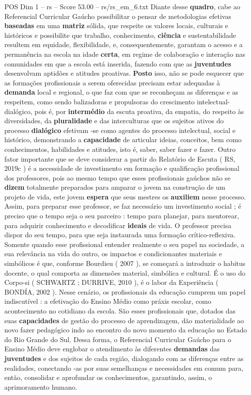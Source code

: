 \begin{textsample}{POS Dim 1 – rs – Score 53.00 – rs/rs\_em\_6.txt}
Diante desse \textbf{quadro}, cabe ao Referencial Curricular Gaúcho possibilitar o pensar de metodologias efetivas \textbf{baseadas} em uma \textbf{matriz} sólida, que respeite os valores locais, culturais e históricos e possibilite que trabalho, conhecimento, \textbf{ciência} e sustentabilidade resultem em equidade, flexibilidade, e, consequentemente, garantam o acesso e a permanência na escola na idade \textbf{certa}, em regime de colaboração e interação nas comunidades em que a escola está inserida, fazendo com que as \textbf{juventudes} desenvolvam aptidões e atitudes proativas. \textbf{Posto} isso, não se pode esquecer que as formações profissionais a serem oferecidas precisam estar adequadas à \textbf{demanda} local e regional, o que faz com que se reconheçam as diferenças e as respeitem, como sendo balizadoras e propulsoras do crescimento intelectual-dialógico, pois é, por \textbf{intermédio} da escuta proativa, da empatia, do respeito às diversidades, da \textbf{pluralidade} e das interculturas que os sujeitos ativos do processo \textbf{dialógico} efetivam -se como agentes do processo intelectual, social e histórico, demonstrando a \textbf{capacidade} de articular ideias, conceitos, bem como conhecimentos, habilidades e atitudes, isto é, saber, saber fazer e fazer.
Outro fator importante que se deve considerar a partir do Relatório de Escuta ( RS, 2019c ) é a necessidade de investimento em formação e qualificação profissional dos professores, pois ao mesmo tempo que esses profissionais gaúchos não se \textbf{dizem} totalmente preparados para amparar o jovem na construção de um projeto de vida, este jovem \textbf{espera} que seus mestres os \textbf{auxiliem} nesse processo.
Assim, para preparar esse professor, se faz necessário um investimento social ; é preciso que o tempo seja o seu parceiro : tempo para planejar, para mentorear, para adquirir conhecimento e decodificar \textbf{ideais} de vida.
O professor precisa dispor do seu tempo, para que seja instaurada uma formação crítico-reflexiva.
Somente quando esse profissional entender realmente o seu papel na sociedade, a sua relevância na vida do outro, os impactos e condicionantes materiais e simbólicos é que, conforme Bourdieu ( 2007 ), se começará a introduzir o habitus docente, o qual comporta as dimensões material, simbólica e cultural.
É o uso do Corpo-si ( SCHWARTZ ; DURRIVE, 2010 ), é o labor da Experiência ( BONDÍA, 2002 ).
Nesse cenário, os profissionais da educação cumprem um papel indiscutível : a efetivação do Ensino Médio como práxis escolar, como acontecimento no cotidiano da escola.
São esses profissionais que, dotados das suas \textbf{capacidades} de gestão do processo de aprendizagem, dão materialidade ao novo fazer pedagógico indo ao encontro do novo momento da educação no Estado do Rio Grande do Sul.
Dessa forma, o Referencial Curricular Gaúcho para o Ensino Médio deve englobar o atendimento às diferentes \textbf{demandas} das \textbf{juventudes} e dos sujeitos de cada região, dialogando com as diferenças entre as realidades, conectando -as por suas semelhanças e necessidades em comum para, então, consolidar e aprofundar os conhecimentos, garantindo, assim, o aprimoramento humano.


\end{textsample}
